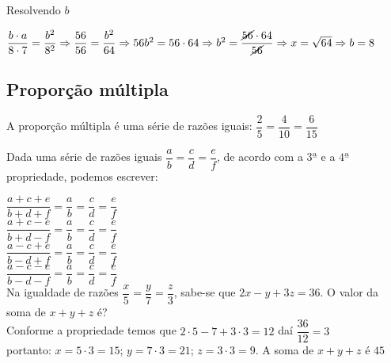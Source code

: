 \begin{enumerate}
Resolvendo $ b $

$ \dfrac{b \cdot a}{8 \cdot 7} = \dfrac{b^2}{8^2} \Rightarrow \dfrac{56}{56} = \dfrac{b^2}{64} \Rightarrow 56b^2 = 56 \cdot 64 \Rightarrow b^2 = \dfrac{\cancel{56} \cdot 64}{\cancel{56}} \Rightarrow x = \sqrt{64} \Rightarrow b = 8 $

\subsection{Proporção múltipla}

A proporção múltipla é uma série de razões iguais: $ \dfrac{2}{5} = \dfrac{4}{10} = \dfrac{6}{15} $

Dada uma série de razões iguais $ \dfrac{a}{b} = \dfrac{c}{d} = \dfrac{e}{f} $, de acordo com a $ 3ª $ e a $ 4ª $ propriedade, podemos escrever:

$ \dfrac{a+c+e}{b+d+f} = \dfrac{a}{b} = \dfrac{c}{d} = \dfrac{e}{f} $\\

$ \dfrac{a+c-e}{b+d-f} = \dfrac{a}{b} = \dfrac{c}{d} = \dfrac{e}{f} $\\

$ \dfrac{a-c+e}{b-d+f} = \dfrac{a}{b} = \dfrac{c}{d} = \dfrac{e}{f} $\\

$ \dfrac{a-c-e}{b-d-f} = \dfrac{a}{b} = \dfrac{c}{d} = \dfrac{e}{f} $\\

Na igualdade de razões $ \dfrac{x}{5} = \dfrac{y}{7} = \dfrac{z}{3} $, sabe-se que $ 2x - y + 3z = 36 $. O valor da soma de $ x + y + z $ é?\\

Conforme a propriedade temos que $ 2 \cdot 5 - 7 + 3 \cdot 3 = 12 $ daí $ \dfrac{36}{12} = 3 $\\

portanto: $ x = 5 \cdot 3 = 15 $; $ y = 7 \cdot 3 = 21 $; $ z = 3 \cdot 3 = 9 $. A soma de $ x + y + z $ é $ 45 $

\end{enumerate}



